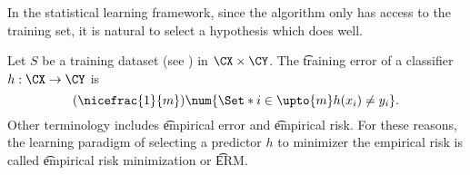 

In the statistical learning framework, since the algorithm only has access to the training set, it is natural to select a hypothesis which does well.


Let $S$ be a training dataset (see ) in $\CX \times \CY$.
The \t{training error} of a classifier $h: \CX \to \CY$ is
\[
  (\nicefrac{1}{m})\num{\Set*{i \in \upto{m}}{h(x_i) \neq y_i}}.
\]
Other terminology includes \t{empirical error} and \t{empirical risk}.
For these reasons, the learning paradigm of selecting a predictor $h$ to minimizer the empirical risk is called \t{empirical risk minimization} or \t{ERM}. 


\blankpage
